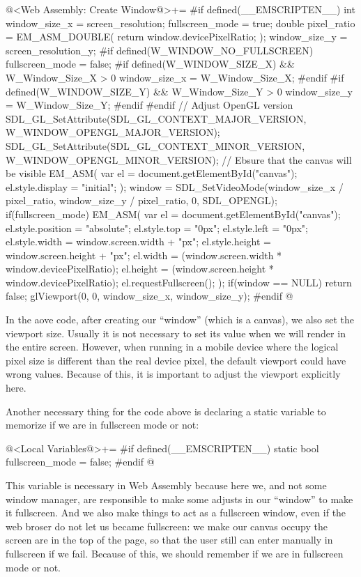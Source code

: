 \iniciocodigo
@<Web Assembly: Create Window@>+=
#if defined(__EMSCRIPTEN__)
{
  int window_size_x = screen_resolution;
  fullscreen_mode = true;
  double pixel_ratio = EM_ASM_DOUBLE({
    return window.devicePixelRatio;
  });
  window_size_y = screen_resolution_y;
#if defined(W_WINDOW_NO_FULLSCREEN)
  fullscreen_mode = false;
#if defined(W_WINDOW_SIZE_X) && W_Window_Size_X > 0
  window_size_x = W_Window_Size_X;
#endif
#if defined(W_WINDOW_SIZE_Y) && W_Window_Size_Y > 0
  window_size_y = W_Window_Size_Y;
#endif
#endif
  // Adjust OpenGL version
  SDL_GL_SetAttribute(SDL_GL_CONTEXT_MAJOR_VERSION,
                     W_WINDOW_OPENGL_MAJOR_VERSION);
  SDL_GL_SetAttribute(SDL_GL_CONTEXT_MINOR_VERSION,
                     W_WINDOW_OPENGL_MINOR_VERSION);
  // Ebsure that the canvas will be visible
  EM_ASM(
    var el = document.getElementById("canvas");
    el.style.display = "initial";
  );
  window = SDL_SetVideoMode(window_size_x / pixel_ratio,
                            window_size_y / pixel_ratio, 0, SDL_OPENGL);
  if(fullscreen_mode){
    EM_ASM(
      var el = document.getElementById("canvas");
      el.style.position = "absolute";
      el.style.top = "0px";
      el.style.left = "0px";
      el.style.width = window.screen.width + "px";
      el.style.height = window.screen.height + "px";
      el.width = (window.screen.width * window.devicePixelRatio);
      el.height = (window.screen.height * window.devicePixelRatio);
      el.requestFullscreen();
    );
  }
  if(window == NULL)
    return false;
  glViewport(0, 0, window_size_x, window_size_y);
}
#endif
@
\fimcodigo

In the aove code, after creating our ``window'' (which is a canvas),
we also set the viewport size. Usually it is not necessary to set its
value when we will render in the entire screen. However, when running
in a mobile device where the logical pixel size is different than the
real device pixel, the default viewport could have wrong
values. Because of this, it is important to adjust the viewport
explicitly here.

Another necessary thing for the code above is declaring a static
variable to memorize if we are in fullscreen mode or not:

\iniciocodigo
@<Local Variables@>+=
#if defined(__EMSCRIPTEN__)
static bool fullscreen_mode = false;
#endif
@
\fimcodigo

This variable is necessary in Web Assembly because here we, and not
some window manager, are responsible to make some adjusts in our
``window'' to make it fullscreen. And we also make things to act as a
fullscreen window, even if the web broser do not let us became
fullscreen: we make our canvas occupy the screen are in the top of the
page, so that the user still can enter manually in fullscreen if we
fail. Because of this, we should remember if we are in fullscreen mode
or not.

